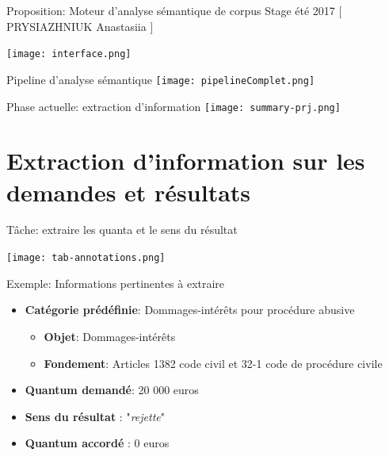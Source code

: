 \documentclass[newPxFont,pagenumber]{beamer}
\begin{document}
\begin{frame}{Proposition: Moteur d'analyse sémantique de corpus}
Stage été 2017 [ PRYSIAZHNIUK Anastasiia ]
\begin{center}
\texttt{[image: interface.png]}
\end{center}
\end{frame}

\begin{frame}{Pipeline d'analyse sémantique}
\centering\texttt{[image: pipelineComplet.png]}
\end{frame}

\begin{frame}{Phase actuelle: extraction d'information}
\centering\texttt{[image: summary-prj.png]}
\end{frame}

\section{Extraction d'information sur les demandes et  résultats}

\begin{frame}{T\^ache: extraire les quanta et le sens du résultat}
\begin{table}
\centering \texttt{[image: tab-annotations.png]}
\caption{\scriptsize Tableau des informations sur les demandes}
\end{table}

\begin{exampleblock}{Exemple: Informations pertinentes à extraire}%
\begin{itemize}\scriptsize
\item \textbf{Catégorie prédéfinie}: Dommages-intérêts pour procédure abusive
\begin{itemize}\scriptsize
\item \textbf{Objet}: Dommages-intérêts
\item \textbf{Fondement}: Articles 1382 code civil et 32-1 code de procédure civile
\end{itemize}
\item \textbf{Quantum demandé}: 20 000 euros
\item \textbf{Sens du résultat} : "\textit{rejette}"
\item \textbf{Quantum accordé} : 0 euros
\end{itemize}
\end{exampleblock}
\end{frame}
\end{document}
